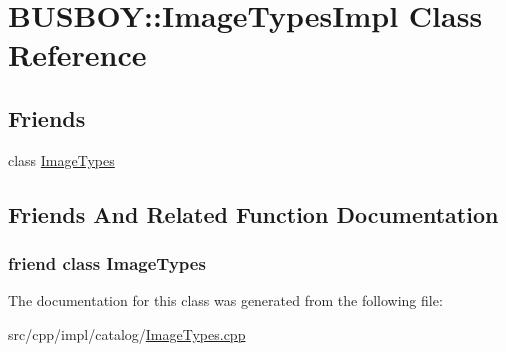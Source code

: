 \hypertarget{classBUSBOY_1_1ImageTypesImpl}{
\section{BUSBOY::ImageTypesImpl Class Reference}
\label{classBUSBOY_1_1ImageTypesImpl}
}
\subsection*{Friends}
\begin{DoxyCompactItemize}
\item 
class \hyperlink{classBUSBOY_1_1ImageTypesImpl_adbfa8b0db2359a82e1e88c9b1148943e}{ImageTypes}
\end{DoxyCompactItemize}


\subsection{Friends And Related Function Documentation}
\hypertarget{classBUSBOY_1_1ImageTypesImpl_adbfa8b0db2359a82e1e88c9b1148943e}{
\subsubsection[{ImageTypes}]{\setlength{\rightskip}{0pt plus 5cm}friend class {\bf ImageTypes}}}
\label{classBUSBOY_1_1ImageTypesImpl_adbfa8b0db2359a82e1e88c9b1148943e}


The documentation for this class was generated from the following file:\begin{DoxyCompactItemize}
\item 
src/cpp/impl/catalog/\hyperlink{ImageTypes_8cpp}{ImageTypes.cpp}\end{DoxyCompactItemize}
